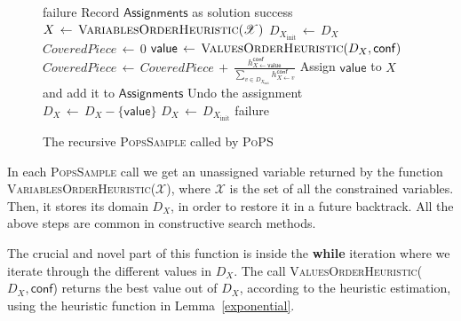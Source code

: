 \documentclass{ws-ijait}
\begin{document}
\begin{figure}
  \centering
  \begin{algorithmic}
        \State \Return failure
        \State Record $\mathsf{Assignments}$ as solution
        \State \Return success
      \EndIf
      \State $X \, \gets \,
              \Call{VariablesOrderHeuristic}{\mathscr{X}}$
      \State $D_{X_\mathrm{init}} \, \gets \, D_X$
      \State $\mathit{CoveredPiece} \, \gets \, 0$
        \State $\mathsf{value} \, \gets \,
                \Call{ValuesOrderHeuristic}{D_X, \mathsf{conf}}$
        \State $\mathit{CoveredPiece} \, \gets \,
                \mathit{CoveredPiece} \, + \,
                \frac{h_{X \gets \mathsf{value}}^\mathsf{conf}}
                     {\sum_{v \in D_{X_\mathrm{init}}}
                      h_{X \gets v}^\mathsf{conf}}$
        \State Assign $\mathsf{value}$ to $X$ and add it to
               $\mathsf{Assignments}$
        \State {}
        \State Undo the assignment
        \State $D_X \, \gets \, D_X - \{\mathsf{value}\}$
      \EndWhile
      \State $D_X \, \gets \, D_{X_\mathrm{init}}$
      \State \Return failure
    \EndFunction
  \end{algorithmic}
  \caption{The recursive {\normalfont\textsc{PopsSample}}
           called by
           {\normalfont\textsc{PoPS}}\label{PopsSample}}
\end{figure}

In each \textsc{PopsSample} call we get an unassigned
variable returned by the function
\textsc{VariablesOrderHeuristic}($\mathscr{X}$), where
$\mathscr{X}$ is the set of all the constrained variables.
Then, it stores its domain $D_X$, in order to restore it in
a future backtrack. All the above steps are common in
constructive search methods.

The crucial and novel part of this function is inside the
\textbf{while} iteration where we iterate through the
different values in $D_X$. The call
\textsc{ValuesOrderHeuristic}($D_X, \mathsf{conf}$) returns
the best value out of $D_X$, according to the heuristic
estimation, using the heuristic function in
Lemma~\ref{exponential}.
\end{document}
